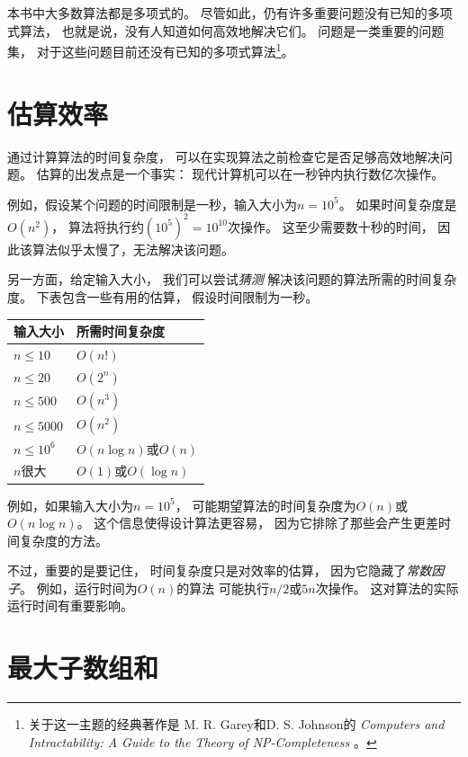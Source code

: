 本书中大多数算法都是多项式的。
尽管如此，仍有许多重要问题没有已知的多项式算法，
也就是说，没有人知道如何高效地解决它们。
问题是一类重要的问题集，
对于这些问题目前还没有已知的多项式算法\footnote{关于这一主题的经典著作是
M. R. Garey和D. S. Johnson的
\emph{Computers and Intractability: A Guide to the Theory
of NP-Completeness} \cite{gar79}。}。

\section{估算效率}

通过计算算法的时间复杂度，
可以在实现算法之前检查它是否足够高效地解决问题。
估算的出发点是一个事实：
现代计算机可以在一秒钟内执行数亿次操作。

例如，假设某个问题的时间限制是一秒，输入大小为$n=10^5$。
如果时间复杂度是$O(n^2)$，
算法将执行约$(10^5)^2=10^{10}$次操作。
这至少需要数十秒的时间，
因此该算法似乎太慢了，无法解决该问题。

另一方面，给定输入大小，
我们可以尝试\emph{猜测}
解决该问题的算法所需的时间复杂度。
下表包含一些有用的估算，
假设时间限制为一秒。

\begin{center}
\begin{tabular}{ll}
输入大小 & 所需时间复杂度 \\
\hline
$n \le 10$ & $O(n!)$ \\
$n \le 20$ & $O(2^n)$ \\
$n \le 500$ & $O(n^3)$ \\
$n \le 5000$ & $O(n^2)$ \\
$n \le 10^6$ & $O(n \log n)$或$O(n)$ \\
$n$很大 & $O(1)$或$O(\log n)$ \\
\end{tabular}
\end{center}

例如，如果输入大小为$n=10^5$，
可能期望算法的时间复杂度为$O(n)$或$O(n \log n)$。
这个信息使得设计算法更容易，
因为它排除了那些会产生更差时间复杂度的方法。


不过，重要的是要记住，
时间复杂度只是对效率的估算，
因为它隐藏了\emph{常数因子}。
例如，运行时间为$O(n)$的算法
可能执行$n/2$或$5n$次操作。
这对算法的实际运行时间有重要影响。

\section{最大子数组和}

